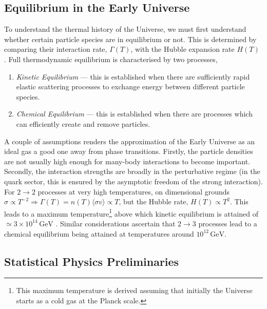 \documentclass[11pt]{article}
\numberwithin{equation}{section}
\numberwithin{figure}{section}
\numberwithin{table}{section}
\begin{document}
\subsection{Equilibrium in the Early Universe}

To understand the thermal history of the Universe, we must first understand whether certain particle species are in equilibrium or not. This is determined by comparing their interaction rate, $\Gamma(T)$, with the Hubble expansion rate $H(T)$ \citep{Schramm:1977ne}. Full thermodynamic equilibrium is characterised by two processes,
\begin{enumerate}
\item \textit{Kinetic Equilibrium} --- this is established when there are sufficiently rapid elastic scattering processes to exchange energy between different particle species.
\item \textit{Chemical Equilibrium} --- this is established when there are processes which can efficiently create and remove particles.
\end{enumerate}
A couple of assumptions renders the approximation of the Early Universe as an ideal gas a good one away from phase transitions. Firstly, the particle densities are not usually high enough for many-body interactions to become important. Secondly, the interaction strengths are broadly in the perturbative regime (in the quark sector, this is ensured by the asymptotic freedom of the strong interaction). For $2 \rightarrow 2$ processes at very high temperatures, on dimensional grounds $\sigma \propto T^{-2} \Rightarrow \Gamma(T) = n(T)\langle \sigma v \rangle \propto T$, but the Hubble rate, $H(T) \propto T^2$. This leads to a maximum temperature\footnote{This maximum temperature is derived assuming that initially the Universe starts as a cold gas at the Planck scale.} above which kinetic equilibrium is attained of $\simeq 3 \times 10^{14}\,\mathrm{GeV}$ \citep{Elmfors:1993pz}. Similar considerations ascertain that $2 \rightarrow 3$ processes lead to a chemical equilibrium being attained at temperatures around $10^{12}\,\mathrm{GeV}$.

\subsection{Statistical Physics Preliminaries}
\end{document}
